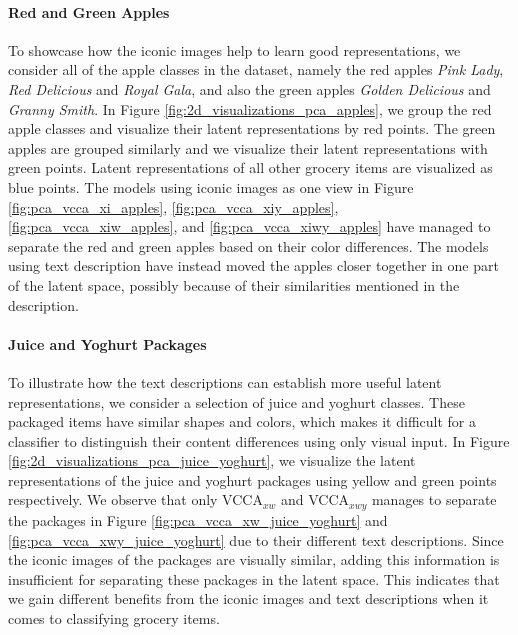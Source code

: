 \paragraph{Red and Green Apples} To showcase how the iconic images help to learn good representations, we consider all of the apple classes in the dataset, namely the red apples \textit{Pink Lady}, \textit{Red Delicious} and \textit{Royal Gala}, and also the green apples \textit{Golden Delicious} and \textit{Granny Smith}. In Figure \ref{fig:2d_visualizations_pca_apples}, we group the red apple classes and visualize their latent representations by red points. The green apples are grouped similarly and we visualize their latent representations with green points. Latent representations of all other grocery items are visualized as blue points. The models using iconic images as one view in Figure \ref{fig:pca_vcca_xi_apples}, \ref{fig:pca_vcca_xiy_apples}, \ref{fig:pca_vcca_xiw_apples}, and \ref{fig:pca_vcca_xiwy_apples} have managed to separate the red and green apples based on their color differences. The models using text description have instead moved the apples closer together in one part of the latent space, possibly because of their similarities mentioned in the description. 



\vspace{-3mm}
\paragraph{Juice and Yoghurt Packages} To illustrate how the text descriptions can establish more useful latent representations, we consider a selection of juice and yoghurt classes. These packaged items have similar shapes and colors, which makes it difficult for a classifier to distinguish their content differences using only visual input. In Figure \ref{fig:2d_visualizations_pca_juice_yoghurt}, we visualize the latent representations of the juice and yoghurt packages using yellow and green points respectively. We observe that only VCCA$_{x w}$ and VCCA$_{x w y}$ manages to separate the packages in Figure \ref{fig:pca_vcca_xw_juice_yoghurt} and \ref{fig:pca_vcca_xwy_juice_yoghurt} due to their different text descriptions. Since the iconic images of the packages are visually similar, adding this information is insufficient for separating these packages in the latent space. This indicates that we gain different benefits from the iconic images and text descriptions when it comes to classifying grocery items.

